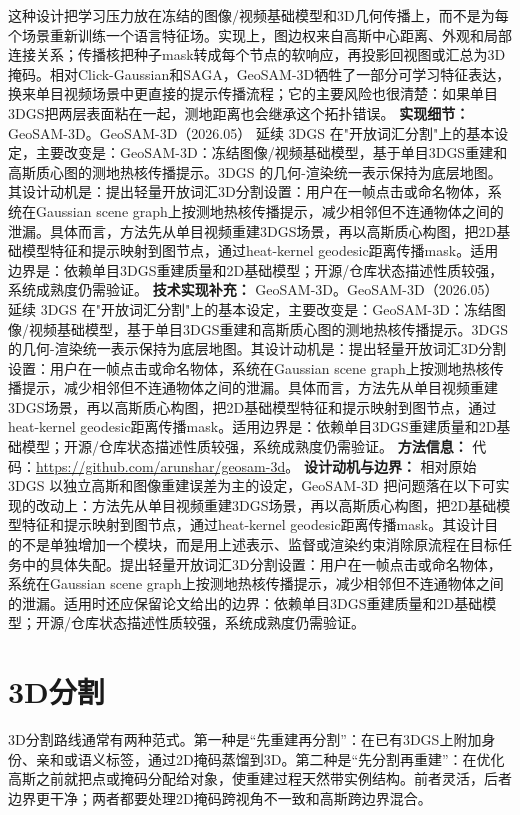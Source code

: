 这种设计把学习压力放在冻结的图像/视频基础模型和3D几何传播上，而不是为每个场景重新训练一个语言特征场。实现上，图边权来自高斯中心距离、外观和局部连接关系；传播核把种子mask转成每个节点的软响应，再投影回视图或汇总为3D掩码。相对Click-Gaussian和SAGA，GeoSAM-3D牺牲了一部分可学习特征表达，换来单目视频场景中更直接的提示传播流程；它的主要风险也很清楚：如果单目3DGS把两层表面粘在一起，测地距离也会继承这个拓扑错误。
\textbf{实现细节：} GeoSAM-3D。GeoSAM-3D（2026.05） 延续 3DGS 在"开放词汇分割"上的基本设定，主要改变是：GeoSAM-3D：冻结图像/视频基础模型，基于单目3DGS重建和高斯质心图的测地热核传播提示。3DGS 的几何-渲染统一表示保持为底层地图。其设计动机是：提出轻量开放词汇3D分割设置：用户在一帧点击或命名物体，系统在Gaussian scene graph上按测地热核传播提示，减少相邻但不连通物体之间的泄漏。具体而言，方法先从单目视频重建3DGS场景，再以高斯质心构图，把2D基础模型特征和提示映射到图节点，通过heat-kernel geodesic距离传播mask。适用边界是：依赖单目3DGS重建质量和2D基础模型；开源/仓库状态描述性质较强，系统成熟度仍需验证。
\textbf{技术实现补充：} GeoSAM-3D。GeoSAM-3D（2026.05） 延续 3DGS 在"开放词汇分割"上的基本设定，主要改变是：GeoSAM-3D：冻结图像/视频基础模型，基于单目3DGS重建和高斯质心图的测地热核传播提示。3DGS 的几何-渲染统一表示保持为底层地图。其设计动机是：提出轻量开放词汇3D分割设置：用户在一帧点击或命名物体，系统在Gaussian scene graph上按测地热核传播提示，减少相邻但不连通物体之间的泄漏。具体而言，方法先从单目视频重建3DGS场景，再以高斯质心构图，把2D基础模型特征和提示映射到图节点，通过heat-kernel geodesic距离传播mask。适用边界是：依赖单目3DGS重建质量和2D基础模型；开源/仓库状态描述性质较强，系统成熟度仍需验证。
\textbf{方法信息：} 代码：\url{https://github.com/arunshar/geosam-3d}。
\textbf{设计动机与边界：} 相对原始 3DGS 以独立高斯和图像重建误差为主的设定，GeoSAM-3D 把问题落在以下可实现的改动上：方法先从单目视频重建3DGS场景，再以高斯质心构图，把2D基础模型特征和提示映射到图节点，通过heat-kernel geodesic距离传播mask。其设计目的不是单独增加一个模块，而是用上述表示、监督或渲染约束消除原流程在目标任务中的具体失配。提出轻量开放词汇3D分割设置：用户在一帧点击或命名物体，系统在Gaussian scene graph上按测地热核传播提示，减少相邻但不连通物体之间的泄漏。适用时还应保留论文给出的边界：依赖单目3DGS重建质量和2D基础模型；开源/仓库状态描述性质较强，系统成熟度仍需验证。

\section{3D分割}

3D分割路线通常有两种范式。第一种是“先重建再分割”：在已有3DGS上附加身份、亲和或语义标签，通过2D掩码蒸馏到3D。第二种是“先分割再重建”：在优化高斯之前就把点或掩码分配给对象，使重建过程天然带实例结构。前者灵活，后者边界更干净；两者都要处理2D掩码跨视角不一致和高斯跨边界混合。
